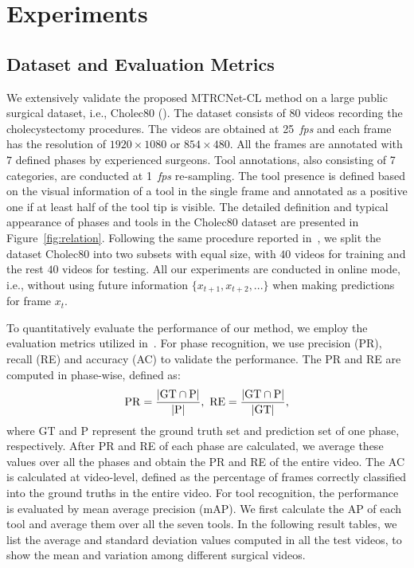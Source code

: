 \documentclass{elsarticle}
\begin{document}
\section{Experiments}
\subsection{Dataset and Evaluation Metrics}
We extensively validate the proposed MTRCNet-CL method on a large public surgical dataset, i.e., Cholec80 (\cite{Cholec}).
The dataset consists of $80$ videos recording the cholecystectomy procedures.
The videos are obtained at 25~\emph{fps} and each frame has the resolution of $1920 \times 1080$ or $854 \times 480$.
All the frames are annotated with $7$ defined phases by experienced surgeons.
Tool annotations, also consisting of 7 categories, are conducted at 1~\emph{fps} re-sampling.
The tool presence is defined based on the visual information of a tool in the single frame and annotated as a positive one if at least half of the tool tip is visible.
The detailed definition and typical appearance of phases and tools in the Cholec80 dataset are presented in Figure~\ref{fig:relation}.
Following the same procedure reported in~\cite{twinanda2017endonet}, we split the dataset Cholec80 into two subsets with equal size, with $40$ videos for training and the rest $40$ videos for testing.
All our experiments are conducted in online mode, i.e., without using future information $\{x_{t+1}, x_{t+2},...\}$ when making predictions for frame $x_t$.


To quantitatively evaluate the performance of our method, we employ the evaluation metrics utilized in~\cite{twinanda2017endonet}.
For phase recognition, we use precision (PR), recall (RE) and accuracy (AC) to validate the performance.
The PR and RE are computed in phase-wise, defined as:
\begin{equation}
	\label{eq:eva}
	\centering
	\begin{gathered}
		\mathrm{PR}=\frac{|\mathrm{GT} \cap \mathrm{P}|}{|\mathrm{P}|}, ~ \mathrm{RE}=\frac{|\mathrm{GT} \cap \mathrm{P}|}{|\mathrm{GT}|},\\
	\end{gathered}
	\small
\end{equation}
where $\mathrm{GT}$ and $\mathrm{P}$ represent the ground truth set and prediction set of one phase, respectively.
After PR and RE of each phase are calculated, we average these values over all the phases and obtain the PR and RE of the entire video.
The AC is calculated at video-level, defined as the percentage of frames correctly classified into the ground truths in the entire video.
For tool recognition, the performance is evaluated by mean average precision (mAP).
We first calculate the AP of each tool and average them over all the seven tools.
In the following result tables, we list the average and standard deviation values computed in all the test videos, to show the mean and variation among different surgical videos.
\end{document}
